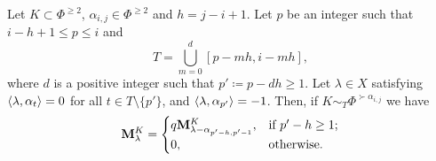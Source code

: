 

    





\begin{lemma}\rm\label{lem: left solving}
Let $K \subset \Phi^{\geq 2}$, $\alpha_{i,j} \in \Phi^{\geq 2}$ and $h = j - i + 1$. 
Let $p$ be an integer such that $i -h +1\leq p \leq i$ and 
$$T =  \bigcup_{m = 0}^{d} [p-mh,i-mh],$$
where $d$ is a positive integer such that $p'\coloneqq p - dh \geq 1$.
Let $\lambda \in X$ satisfying $\langle \lambda , \alpha_t \rangle = 0$ for all $t \in T \setminus \{p'\}$, and $\langle \lambda , \alpha_{p'} \rangle = -1$. Then, if  $K \sim_{T} \Phi^{\succ \alpha_{i,j}}$ we have
\begin{equation}\label{eq: left solving}
    \mathbf{M}_{\lambda}^{K} = 
\begin{cases} 
q \mathbf{M}_{\lambda - \alpha_{{p'} -h, {p'} - 1}}^{K}, & \text{if } {p'} - h \geq 1; \\
0, & \text{otherwise}.
\end{cases}
\end{equation}
\end{lemma} 

